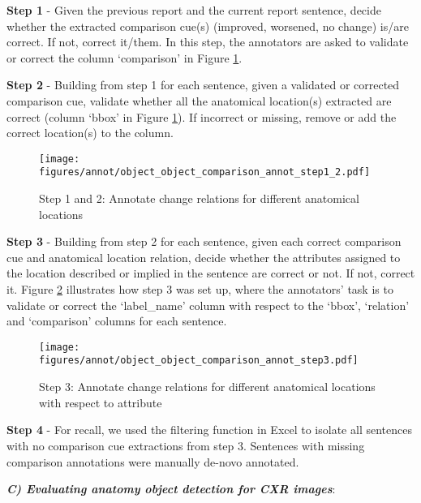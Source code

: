 \textbf{Step 1} - Given the previous report and the current report sentence, decide whether the extracted comparison cue(s) (improved, worsened, no change) is/are correct. If not, correct it/them. In this step, the annotators are asked to validate or correct the column `comparison' in Figure \ref{fig:object-comparison-step12}.

\textbf{Step 2} - Building from step 1 for each sentence, given a validated or corrected comparison cue, validate whether all the anatomical location(s) extracted are correct (column `bbox' in Figure \ref{fig:object-comparison-step12}). If incorrect or missing, remove or add the correct location(s) to the column.

\begin{figure}[!ht]
\centering
\texttt{[image: figures/annot/object\_object\_comparison\_annot\_step1\_2.pdf]}
\caption{Step 1 and 2: Annotate change relations for different anatomical locations}
\label{fig:object-comparison-step12}
\end{figure}

\textbf{Step 3} - Building from step 2 for each sentence, given each correct comparison cue and anatomical location relation, decide whether the attributes assigned to the location described or implied in the sentence are correct or not. If not, correct it. Figure \ref{fig:object-comparison-step3} illustrates how step 3 was set up, where the annotators' task is to validate or correct the `label\_name' column with respect to the `bbox', `relation' and `comparison' columns for each sentence.

\begin{figure}[!ht]
\centering
\texttt{[image: figures/annot/object\_object\_comparison\_annot\_step3.pdf]}
\caption{Step 3: Annotate change relations for different anatomical locations with respect to attribute}
\label{fig:object-comparison-step3}
\end{figure}

\textbf{Step 4} - For recall, we used the filtering function in Excel to isolate all sentences with no comparison cue extractions from step 3. Sentences with missing comparison annotations were manually de-novo annotated.

\vspace{+10pt}
\textbf{\textit{C) Evaluating anatomy object detection for CXR images}}: 
\vspace{+5pt}


